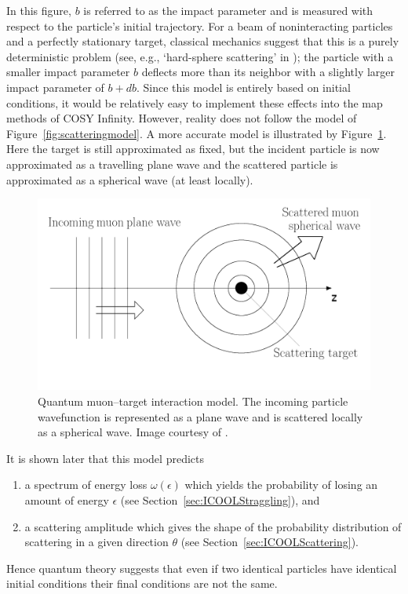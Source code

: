 In this figure, $b$ is referred to as the impact parameter and is measured with respect to the particle's initial trajectory. For a beam of noninteracting particles and a perfectly stationary target, classical mechanics suggest that this is a purely deterministic problem (see, e.g., `hard-sphere scattering' in \cite{griffithsqm}); the particle with a smaller impact parameter $b$ deflects more than its neighbor with a slightly larger impact parameter of $b+db$. Since this model is entirely based on initial conditions, it would be relatively easy to implement these effects into the map methods of COSY Infinity. However, reality does not follow the model of Figure~\ref{fig:scatteringmodel}. A more accurate model is illustrated by Figure~\ref{fig:scatteringmodel2}. Here the target is still approximated as fixed, but the incident particle is now approximated as a travelling plane wave and the scattered particle is approximated as a spherical wave (at least locally).
\begin{figure}
  \centering
    \includegraphics[width=\textwidth]{Figures/scattering_model_2} 
  \caption[Quantum muon--target interaction model.]{Quantum muon--target interaction model. The incoming particle wavefunction is represented as a plane wave and is scattered locally as a spherical wave. Image courtesy of \cite{griffithsqm}.}
  \label{fig:scatteringmodel2}
\end{figure}
It is shown later that this model predicts 
\begin{enumerate}
\item a spectrum of energy loss $\omega(\epsilon)$ which yields the probability of losing an amount of energy $\epsilon$ (see Section~\ref{sec:ICOOLStraggling}), and
\item a scattering amplitude which gives the shape of the probability distribution of scattering in a given direction $\theta$ (see Section~\ref{sec:ICOOLScattering}).
\end{enumerate}
Hence quantum theory suggests that even if two identical particles have identical initial conditions their final conditions are not the same.

